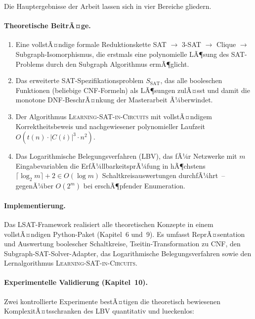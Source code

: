 ﻿\documentclass[a4paper,12pt]{article}
\theoremstyle{definition}
\begin{document}
Die Hauptergebnisse der Arbeit lassen sich in vier Bereiche gliedern.

\paragraph{Theoretische BeitrÃ¤ge.}
\begin{enumerate}
	\item\label{res:reduktion}
	  Eine vollstÃ¤ndige formale Reduktionskette
	  SAT $\to$ 3-SAT $\to$ Clique $\to$ Subgraph-Isomorphismus, die erstmals eine
	  polynomielle LÃ¶sung des SAT-Problems durch den Subgraph Algorithmus \cite{Epp26,
	  Epp26} ermÃ¶glicht.

	\item\label{res:problem}
	  Das erweiterte SAT-Spezifikationsproblem $S_{\text{SAT}}$, das alle booleschen
	  Funktionen (beliebige CNF-Formeln) als LÃ¶sungen zulÃ¤sst und damit die monotone
	  DNF-BeschrÃ¤nkung der Masterarbeit \cite{Epp13} Ã¼berwindet.

	\item\label{res:algorithmus}
	  Der Algorithmus \textsc{Learning-SAT-in-Circuits} mit vollstÃ¤ndigem Korrektheitsbeweis
	  und nachgewiesener polynomieller Laufzeit $O(t(n) \cdot |C(i)|^3 \cdot n^2)$.

	\item\label{res:lbv}
	  Das Logarithmische Belegungsverfahren (LBV), das fÃ¼r Netzwerke mit $m$
	  Eingabevariablen die ErfÃ¼llbarkeitsprÃ¼fung in hÃ¶chstens
	  $\lceil\log_2 m\rceil + 2 \in O(\log m)$ Schaltkreisauswertungen durchfÃ¼hrt~--
	  gegenÃ¼ber $O(2^m)$ bei erschÃ¶pfender Enumeration.
\end{enumerate}

\paragraph{Implementierung.}
Das LSAT-Framework realisiert alle theoretischen Konzepte in einem vollstÃ¤ndigen
Python-Paket (Kapitel~6 und~9).  Es umfasst ReprÃ¤sentation und Auswertung boolescher
Schaltkreise, Tseitin-Transformation zu CNF, den Subgraph-SAT-Solver-Adapter,
das Logarithmische Belegungsverfahren sowie den Lernalgorithmus \textsc{Learning-SAT-in-Circuits}.

\paragraph{Experimentelle Validierung (Kapitel~10).}
Zwei kontrollierte Experimente bestÃ¤tigen die theoretisch bewiesenen KomplexitÃ¤tsschranken
 des LBV quantitativ und lueckenlos:
\end{document}
